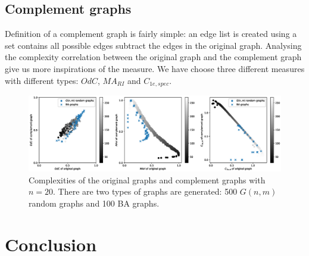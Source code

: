 \documentclass[12pt]{article}
\begin{document}
\subsection{Complement graphs}
Definition of a complement graph is fairly simple: an edge list is created using a set contains all possible edges subtract the edges in the original graph. Analysing the complexity correlation between the original graph and the complement graph give us more inspirations of the measure. We have choose three different measures with different types: $OdC$, $MA_{RI}$ and $C_{1e,spec}$.
\begin{figure}[ht]
    \centering
    \label{fig:complement}
    \includegraphics[width = \textwidth]{complement.eps}
    \caption{Complexities of the original graphs and complement graphs with $n=20$. There are two types of graphs are generated: 500 $G(n,m)$ random graphs and 100 BA graphs.}
\end{figure}



\clearpage
\section{Conclusion}

\printbibliography
\end{document}
